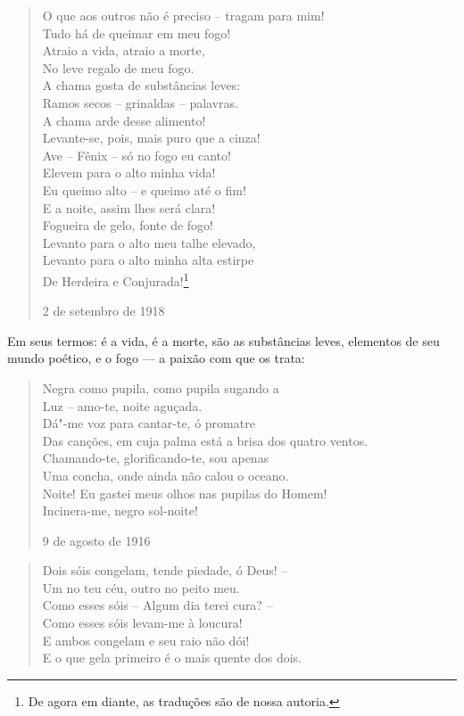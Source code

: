 {{{\begin{verse}
O que aos outros não é preciso -- tragam \qb{}para mim! \\
Tudo há de queimar em meu fogo! \\
Atraio a vida, atraio a morte, \\
No leve regalo de meu fogo. \\[8pt]
A chama gosta de substâncias leves: \\
Ramos secos -- grinaldas -- palavras. \\
A chama arde desse alimento! \\
Levante-se, pois, mais puro que a cinza! \\[8pt]
Ave -- Fênix -- só no fogo eu canto! \\
Elevem para o alto minha vida! \\
Eu queimo alto -- e queimo até o fim! \\
E a noite, assim lhes será clara! \\[8pt]
Fogueira de gelo, fonte de fogo! \\
Levanto para o alto meu talhe elevado, \\
Levanto para o alto minha alta estirpe \\
De Herdeira e Conjurada!\footnote{De agora em diante, as traduções são
  de nossa autoria.}

2 de setembro de 1918

\end{verse}

Em seus termos: é a vida, é a morte, são as substâncias leves, elementos
de seu mundo poético, e o fogo --- a paixão com que os trata:

\begin{verse}
Negra como pupila, como pupila sugando a \\
Luz -- amo-te, noite aguçada. \\[8pt]
Dá"-me voz para cantar-te, ó promatre \\
Das canções, em cuja palma está a brisa \qb{}dos quatro ventos. \\[8pt]
Chamando-te, glorificando-te, sou apenas \\
Uma concha, onde ainda não calou o oceano. \\[8pt]
Noite! Eu gastei meus olhos nas pupilas \qb{}do Homem! \\
Incinera-me, negro sol-noite!

9 de agosto de 1916
\end{verse}

\begin{verse}
Dois sóis congelam, tende piedade, \qb{}ó Deus! -- \\
Um no teu céu, outro no peito meu. \\[8pt]
Como esses sóis -- Algum dia terei cura? -- \\
Como esses sóis levam-me à loucura! \\[8pt]
E ambos congelam e seu raio não dói! \\
E o que gela primeiro é o mais quente \qb{}dos dois.


\end{verse}}}}

